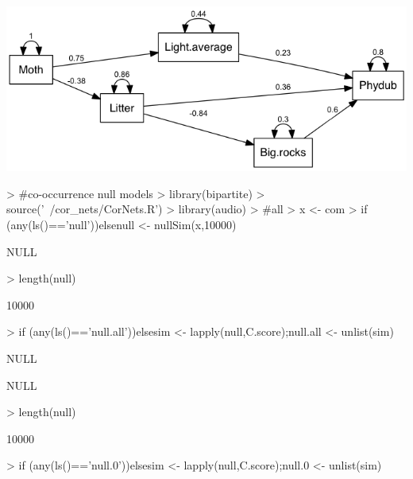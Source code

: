 \documentclass[12pt]{article}
\begin{document}
\includegraphics{semPathPhydub.png}
\pagebreak

\begin{Schunk}
\begin{Sinput}
>                                         #co-occurrence null models
> library(bipartite)
> source('~/cor_nets/CorNets.R')
> library(audio)
>                                         #all
> x <- com
> if (any(ls()=='null')){}else{null <- nullSim(x,10000)}
\end{Sinput}
\begin{Soutput}
NULL
\end{Soutput}
\begin{Sinput}
> length(null)
\end{Sinput}
\begin{Soutput}
[1] 10000
\end{Soutput}
\begin{Sinput}
> if (any(ls()=='null.all')){}else{sim <- lapply(null,C.score);null.all <- unlist(sim)}
\end{Sinput}
\begin{Soutput}
NULL
\end{Soutput}
\begin{Soutput}
NULL
\end{Soutput}
\begin{Sinput}
> length(null)
\end{Sinput}
\begin{Soutput}
[1] 10000
\end{Soutput}
\begin{Sinput}
> if (any(ls()=='null.0')){}else{sim <- lapply(null,C.score);null.0 <- unlist(sim)}

\end{Sinput}
\end{Schunk}
\end{document}
